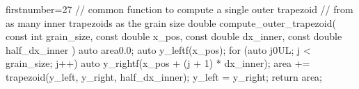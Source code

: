 \begin{cppcode*}{firstnumber=27}
// common function to compute a single outer trapezoid
// from as many inner trapezoids as the grain size
double compute_outer_trapezoid(
    const int grain_size,
    const double x_pos,
    const double dx_inner,
    const double half_dx_inner
) {
    auto area{0.0};
    auto y_left{f(x_pos)};
    for (auto j{0UL}; j < grain_size; j++) {
        auto y_right{f(x_pos + (j + 1) * dx_inner)};
        area += trapezoid(y_left, y_right, half_dx_inner);
        y_left = y_right;
    }
    return area;
}
\end{cppcode*}
